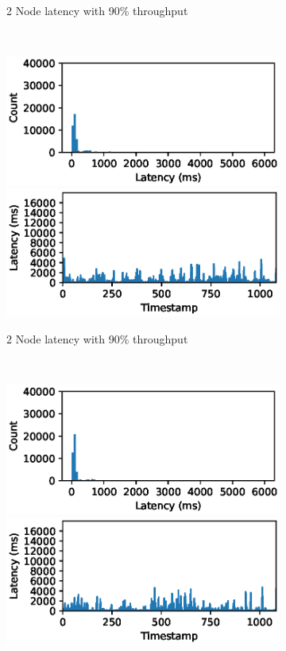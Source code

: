 \begin{figure}
\begin{subfigure}[b]{0.3\textwidth}
        \caption{2 Node latency with 90\% throughput }
    \end{subfigure}
    ~ 
    \begin{subfigure}[b]{0.3\textwidth}
        \includegraphics[width=\textwidth]{eps/flink_agg_4node_th_90_hist}
         \includegraphics[width=\textwidth]{eps/flink_agg_4node_th_90_ts}

        \caption{2 Node latency with 90\% throughput }
    \end{subfigure}
    ~ 
    \begin{subfigure}[b]{0.3\textwidth}
        \includegraphics[width=\textwidth]{eps/flink_agg_8node_th_90_hist}
         \includegraphics[width=\textwidth]{eps/flink_agg_8node_th_90_ts}


\end{subfigure}
\end{figure}

